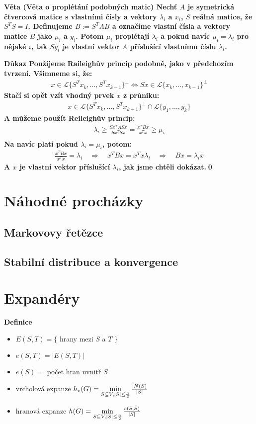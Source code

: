 \documentclass[a4paper,12pt,titlepage]{article}
\newcommand{\dk}{\smallskip\noindent\bf Důkaz\rm{} }
\newcommand{\df}{\smallskip\noindent\bf Definice\rm{} }
\newcommand{\vt}{\smallskip\noindent\bf Věta\rm{} }
\renewcommand{\L}{\mathcal{L}}
\renewcommand{\L}{\mathcal{L}}
\begin{document}
\vt (Věta o proplétání podobných matic) Nechť $A$ je symetrická čtvercová matice 
s vlastními čísly a vektory $\lambda_i$ a $x_i$, $S$ reálná matice, že $S^TS=I$.  
Definujeme $B := S^TAB$ a označíme vlastní čísla a vektory matice $B$ jako 
$\mu_i$ a $y_i$. Potom $\mu_i$ proplétají $\lambda_i$ a pokud navíc $\mu_i = 
\lambda_i$ pro nějaké $i$, tak $Sy_i$ je vlastní vektor $A$ příslušící vlastnímu 
číslu $\lambda_i$.

\dk Použijeme Raileighův princip podobně, jako v předchozím tvrzení. Všimneme 
si, že:
\begin{align}
	x \in \L\{ S^Tx_k, \dots, S^Tx_{k-1}\}^\perp \Leftrightarrow
	Sx \in \L\{ x_k, \dots, x_{k-1}\}^\perp
\end{align}
Stačí si opět vzít vhodný prvek $x$ z průniku:
\begin{align}
	x \in \L\{ S^Tx_k, \dots, S^Tx_{k-1}\}^\perp \cap \L\{y_1, \dots, y_k\}
\end{align}
A můžeme použít Reileighův princip:
\begin{align}
	\lambda_i \geq \frac{Sx^TASx}{Sx^TSx} = \frac{x^TBx}{x^Tx} \geq \mu_i \\
\end{align}
Na navíc platí pokud $\lambda_i = \mu_i$, potom:
\begin{align}
	\frac{x^TBx}{x^Tx} = \lambda_i \quad\Rightarrow\quad x^TBx=x^Tx\lambda_i 
	\quad\Rightarrow\quad Bx = \lambda_i x
\end{align}
A $x$ je vlastní vektor příslušící $\lambda_i$, jak jsme chtěli dokázat.\qed



\section{Náhodné procházky}
\subsection{Markovovy řetězce}
\subsection{Stabilní distribuce a konvergence}

\section{Expandéry}

\df
\begin{itemize}
	\item $E(S,T) = \{$ hrany mezi $S$ a $T$ $\}$
	\item $e(S,T) = |E(S,T)|$
	\item $e(S) = $ počet hran uvnitř $S$
	\item vrcholová expanze $h_v(G) = \min\limits_{S\subseteq V, |S|\le {n\over 2}} {|N(S) \over |S|}$
	\item hranová expanze $h(G) = \min\limits_{S\subseteq V, |S|\le {n\over 2}} {e(S,\bar S) \over |S|}$
\end{itemize}
\end{document}
